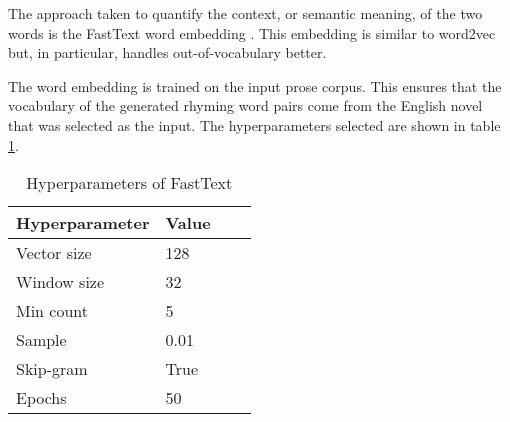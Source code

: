 \documentclass[11pt,a4paper]{article}
\begin{document}
The approach taken to quantify the context, or semantic meaning, of the two words is the FastText word embedding \cite{fasttext}. This embedding is similar to word2vec \cite{wordvec} but, in particular, handles out-of-vocabulary better.

The word embedding is trained on the input prose corpus. This ensures that the vocabulary of the generated rhyming word pairs come from the English novel that was selected as the input. The hyperparameters selected are shown in table \ref{table:HP_fasttext}.

\begin{table}[ht]
\centering
\begin{tabular}{ll c c}
	\hline\hline
	Hyperparameter & Value \\ [0.5ex]
	\hline
	Vector size & 128 \\ [0.5ex]
	Window size & 32 \\ [0.5ex]
	Min count & 5 \\ [0.5ex]
	Sample & 0.01\\ [0.5ex]
	Skip-gram & True\\ [0.5ex]
	Epochs  & 50\\ [0.5ex]
	\hline
\end{tabular}
\caption{Hyperparameters of FastText}
\label{table:HP_fasttext}
\end{table}
\end{document}
